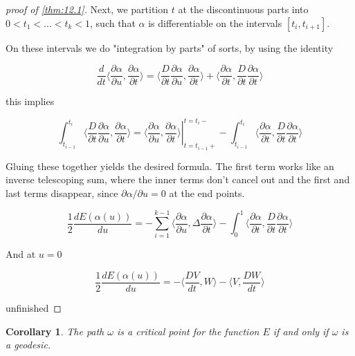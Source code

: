 \documentclass{article}
\newtheorem{proof}{Proof}
\newtheorem{cor}{Corollary}
\newcommand{\angle}[1]{\langle #1 \rangle}
\begin{document}
\begin{proof}[proof of \ref{thm:12.1}]
    Next, we partition $t$ at the discontinuous parts into $0 \lt t_1 \lt \ldots \lt t_k \lt 1$,
    such that $\alpha$ is differentiable on the intervals $[t_i, t_{i+1}]$.

    On these intervals we do "integration by parts" of sorts, by using the identity

    \[
        \frac{d}{dt} \angle{\frac{\partial \alpha}{\partial u}, \frac{\partial \alpha}{\partial t}} =
        \angle{\frac{D}{\partial t} \frac{\partial \alpha}{\partial u}, \frac{\partial \alpha}{\partial t}}
        +
        \angle{\frac{\partial \alpha}{\partial t}, \frac{D}{\partial t} \frac{\partial \alpha}{\partial t}}
    \]

    this implies

    \[
        \int_{t_{i-1}}^{t_i} \angle{\frac{D}{\partial t} \frac{\partial \alpha}{\partial u}, \frac{\partial \alpha}{\partial t}}
        =
        \left.  \angle{\frac{\partial \alpha}{\partial u}, \frac{\partial \alpha}{\partial t}} \right\vert_{t=t_{i-1} +}^{t=t_i -}
        -
        \int_{t_{i-1}}^{t_i} \angle{\frac{\partial \alpha}{\partial t}, \frac{D}{\partial t} \frac{\partial \alpha}{\partial t}}
    \]

    Gluing these together yields the desired formula. The first term works like
    an inverse telescoping sum, where the inner terms don't cancel out and the
    first and last terms disappear, since $\partial \alpha / \partial u = 0$ at
    the end points.

    \[
        \frac{1}{2} \frac{dE(\alpha(u))}{du}
        =
        - \sum_{i=1}^{k-1} \angle{\frac{\partial \alpha}{\partial u}, \Delta \frac{\partial \alpha}{\partial t}}
        -
        \int_{0}^{1} \angle{\frac{\partial \alpha}{\partial t}, \frac{D}{\partial t} \frac{\partial \alpha}{\partial t}}
    \]

    And at $u = 0$

    \[
        \frac{1}{2} \frac{dE(\alpha(u))}{du}
        =
        - \langle \frac{DV}{dt}, W \rangle - \langle V, \frac{DW}{dt} \rangle
    \]

    unfinished
\end{proof}

\begin{cor}
    The path $\omega$ is a critical point for the function $E$ if and only if $\omega$ is a geodesic.
\end{cor}
\end{document}
